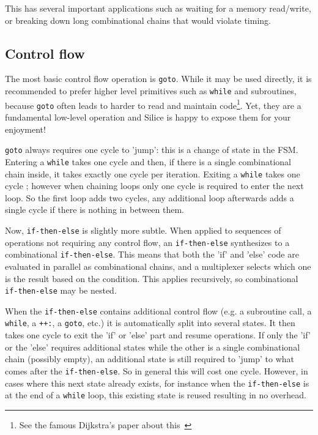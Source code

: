 \documentclass[a4]{article}
\newcommand\silice{Silice}
\begin{document}
This has several important applications such as waiting for a memory read/write, or breaking down long combinational chains that would violate timing.


\subsection{Control flow}

The most basic control flow operation is \texttt{goto}.
While it may be used directly, it is recommended to prefer higher level primitives such as \texttt{while} and subroutines, because \texttt{goto} often leads to harder to read and maintain code\footnote{See the famous Dijkstra's paper about this~\cite{dijkstra}}. 
Yet, they are a fundamental low-level operation and \silice{} is happy to expose them for your enjoyment!

\texttt{goto} always requires one cycle to 'jump': this is a change of state in the FSM. Entering a \texttt{while} takes one cycle and then, if there is a single combinational chain inside, it takes exactly one cycle per iteration. Exiting a \texttt{while} takes one cycle ; however when chaining loops only one cycle is required to enter the next loop. So the first loop adds two cycles, any additional loop afterwards adds a single cycle if there is nothing in between them. 

Now, \texttt{if-then-else} is slightly more subtle. When applied to sequences of operations not requiring any control flow, an \texttt{if-then-else} synthesizes to a combinational \texttt{if-then-else}. This means that both the 'if' and 'else' code are evaluated in parallel as combinational chains, and a multiplexer selects which one is the result based on the condition. This applies recursively, so combinational \texttt{if-then-else} may be nested.

When the \texttt{if-then-else} contains additional control flow (e.g. a subroutine call, a \texttt{while}, a \texttt{++:}, a \texttt{goto}, etc.) it is automatically split into several states. It then takes one cycle to exit the 'if' or 'else' part and resume operations.
If only the 'if' or the 'else' requires additional states while the other is a single combinational chain (possibly empty), an additional state is still required to 'jump' to what comes after the \texttt{if-then-else}. So in general this will cost one cycle. However, in cases where this next state already exists, for instance when the \texttt{if-then-else} is at the end of a \texttt{while} loop, this existing state is reused resulting in no overhead.
\end{document}
